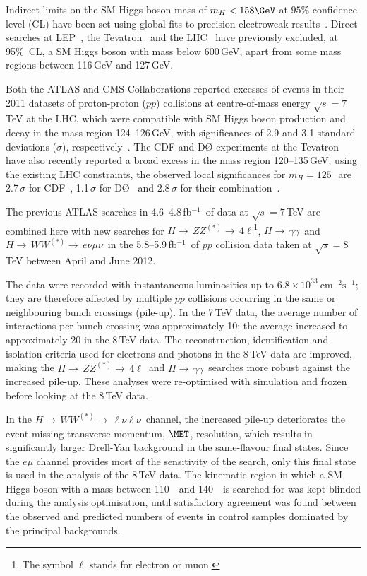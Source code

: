 \documentclass[final,3p,times,twocolumn]{elsarticle}
\newcommand{\hgg}{\ensuremath{H{\rightarrow\,}\gamma\gamma}}
\newcommand{\hWWlnln}{\ensuremath{H{\rightarrow\,}WW^{(*)}{\rightarrow\,}\ell\nu\ell\nu}}
\newcommand{\hwwenmun}{\ensuremath{H{\rightarrow\,}WW^{(*)}{\rightarrow\,}e\nu\mu\nu}}
\newcommand{\hZZllll}{\ensuremath{H{\rightarrow\,}ZZ^{(*)}{\rightarrow\,}4\ell}}
\newcommand\htollll{$H{\rightarrow\,}ZZ^{(*)}{\rightarrow\,}4\ell$}
\newcommand{\infb}{fb$^{-1}$}
\begin{document}
Indirect limits on the SM Higgs boson mass of $m_H<158\GeV$ at $95\%$
confidence level (CL) have been set using global fits to precision
electroweak results~\cite{lepew:2010vi}.  Direct searches at
LEP~\cite{Barate:2003sz}, the Tevatron~\cite{Aaltonen:2012if,D0combo072012,TevatronCombo:2012} and
the LHC~\cite{paper2012prd,Chatrchyan:2012tx} have previously
excluded, at 95\%\ CL, a SM Higgs boson with mass below
600\,GeV, apart from some mass regions between 116\,GeV and 127\,GeV.

Both the ATLAS and CMS Collaborations reported excesses of events in
their 2011 datasets of proton-proton ($pp$) collisions at
centre-of-mass energy $\sqrt{s}=7$\,TeV at the LHC, which were
compatible with SM Higgs boson production and decay in the mass region
124--126\,GeV, with significances of 2.9 and 3.1 standard
deviations ($\sigma$), respectively~\cite{paper2012prd,Chatrchyan:2012tx}.
The CDF and {D\O} experiments at the Tevatron have also recently
reported a broad excess in the mass region 120--135\,GeV; using the 
existing LHC constraints, the observed local significances for
$m_H=125$\,\GeV\ are 2.7\,$\sigma$ for CDF~\cite{Aaltonen:2012if}, 
1.1\,$\sigma$ for D{\O}~\cite{D0combo072012} and 
2.8\,$\sigma$ for their combination~\cite{TevatronCombo:2012}. 

The previous ATLAS searches in 4.6--4.8\,\infb\ of data at
$\sqrt{s}=7$\,TeV are combined here with new searches for \htollll\footnote{The symbol $\ell$ stands for
electron or muon.},
\hgg\ and $\hwwenmun$\ in the 5.8--5.9\,\infb\ of $pp$ collision data taken
at $\sqrt{s}=8$\,TeV between April and June 2012.
 
The data were recorded with instantaneous luminosities
up to $6.8\times 10^{33}~\mathrm{cm}^{-2}\mathrm{s}^{-1}$; they
are therefore affected by multiple $pp$ collisions occurring in the
same or neighbouring bunch crossings (pile-up). In the 7\,TeV
data, the average number of interactions per bunch crossing was approximately
10; the average increased to approximately 20 in the 8\,TeV data.
The reconstruction, identification and isolation criteria used for electrons and photons in the 8\,TeV data   
are improved, making the \hZZllll\ and  \hgg\ searches more robust against the increased pile-up. These analyses were re-optimised with simulation and
frozen before looking at the 8\,TeV data.

In the \hWWlnln\ channel, the
increased pile-up deteriorates the event missing transverse momentum, $\MET$, resolution,
which results in significantly larger Drell-Yan
background in the same-flavour final states. Since the $e\mu$ channel
provides most of the sensitivity of the search, only this
final state is used in the analysis of the 8\,TeV data. 
The kinematic region in which a
SM Higgs boson with a mass between 110~\GeV\ and 140~\GeV\ is searched for
was kept blinded during the analysis optimisation, 
until satisfactory agreement was found between the observed and 
predicted numbers of events in control samples dominated by the principal 
backgrounds.
\end{document}
